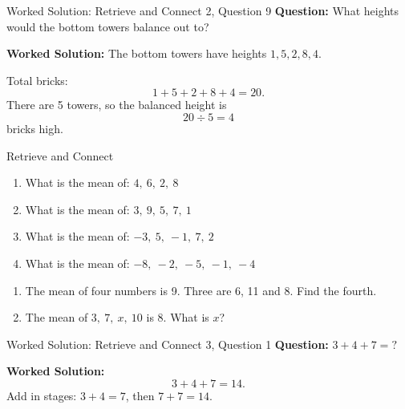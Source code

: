 \documentclass{beamer}
\newcommand{\ashow}[1]{\uncover<2->{\textcolor{red}{\small #1}}}
\newcommand{\ashowq}[1]{\alt<2->{\textcolor{red}{\small #1}}{?}}
\begin{document}
\begin{frame}{Worked Solution: Retrieve and Connect 2, Question 9}
\textbf{Question:} What heights would the bottom towers balance out to?

\textbf{Worked Solution:}
The bottom towers have heights \(1, 5, 2, 8, 4\).

Total bricks:
\[
1 + 5 + 2 + 8 + 4 = 20.
\]
There are 5 towers, so the balanced height is
\[
20 \div 5 = 4
\]
bricks high.
\end{frame}

\begin{frame}{Retrieve and Connect}
\hypertarget{q-st3}{}
\vspace{-0.8em}

\footnotesize
\vspace{0.2em}
\begin{enumerate}\itemsep1pt
  \vspace{-1em}
  \item What is the mean of: $4,\ 6,\ 2,\ 8$ \ashow{5}
  \item What is the mean  of: $3,\ 9,\ 5,\ 7,\ 1$ \ashow{5}
  \item What is the mean  of: $-3,\ 5,\ -1,\ 7,\ 2$ \ashow{2}
  \item What is the mean  of: $-8,\ -2,\ -5,\ -1,\ -4$ \ashow{$-4$}
\end{enumerate}

\begin{enumerate}\itemsep1pt
  \setcounter{enumi}8
  \item The mean of four numbers is 9. Three are 6, 11 and 8. Find the fourth. \ashow{11}
  \item The mean of $3,\ 7,\ x,\ 10$ is $8$. What is $x$? \ashow{12}
\end{enumerate}


\end{frame}

\begin{frame}{Worked Solution: Retrieve and Connect 3, Question 1}
\hypertarget{work-st3}{}
\textbf{Question:} \(3 + 4 + 7 = ?\)

\textbf{Worked Solution:}
\[
3 + 4 + 7 = 14.
\]
Add in stages: \(3 + 4 = 7\), then \(7 + 7 = 14\).
\end{frame}
\end{document}
